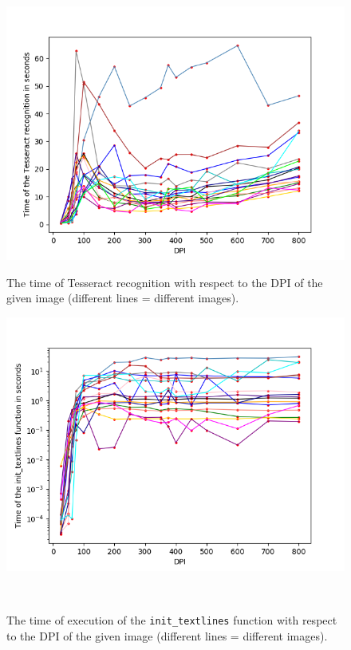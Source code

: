 \begin{figure}[t]
    \centering
    \includegraphics[width=\linewidth]{img/results/dpiTimeTesseract.png}
    \caption{The time of Tesseract recognition with respect to the DPI of the given image (different lines = different images).}
    \label{fig:dpiTessTime}
    \label{fig:textlinesTimeInit}
\endminipage\hfill
{}
    \includegraphics[width=\linewidth]{img/results/dpiTimeInit.png}
    \caption{The time of execution of the \texttt{init\_textlines} function with respect to the DPI of the given image (different lines = different images).}
    \label{fig:dpiInitTime}
\endminipage\\
\minipage{\textwidth}

\end{figure}
